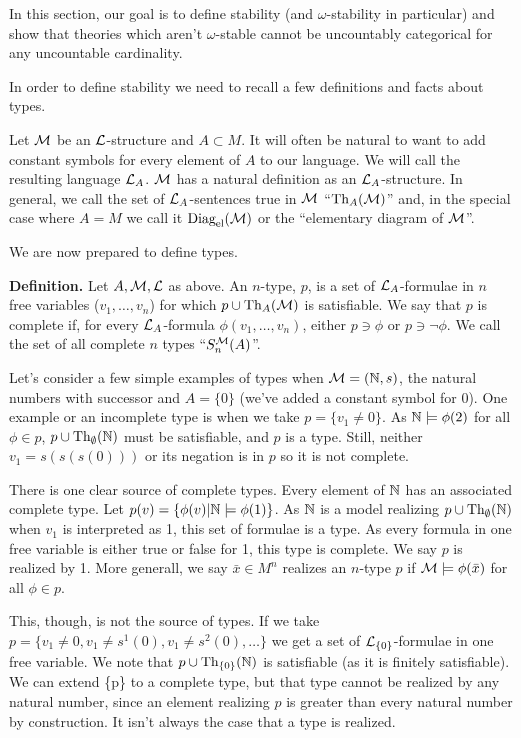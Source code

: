 In this section, our goal is to define stability (and \(\omega\)-stability in particular) and show that theories which aren't \(\omega\)-stable cannot be uncountably categorical for any uncountable cardinality. 

In order to define stability we need to recall a few definitions and facts about types. 

Let \(\mathcal{M}\) be an \(\mathcal{L}\)-structure and \(A \subset M\). It will often be natural to want to add constant symbols for every element of \(A\) to our language. 
We will call the resulting language \(\mathcal{L}_A\). \(\mathcal{M}\) has a natural definition as an \(\mathcal{L}_A\)-structure. In general, we call the set of \(\mathcal{L}_A\)-sentences true in \(\mathcal{M}\) ``\(\text{Th}_A(\mathcal{M})\)'' and, in the special case where \(A = M\) we call it \(\text{Diag}_\text{el}(\mathcal{M})\) or the ``elementary diagram of \(\mathcal{M}\)''. 

We are now prepared to define types. 

\textbf{Definition.} Let \(A, \mathcal{M}, \mathcal{L}\) as above. An \(n\)-type, \(p\), is a set of \(\mathcal{L}_A\)-formulae in \(n\) free variables (\(v_1, \ldots, v_n\)) for which \(p \cup \text{Th}_A(\mathcal{M})\) is satisfiable.
We say that \(p\) is complete if, for every \(\mathcal{L}_A\)-formula \(\phi(v_1, \ldots, v_n)\), either \(p \ni \phi\) or \(p \ni \neg \phi\). We call the set of all complete \(n\) types ``\(S_n^{\mathcal{M}}(A)\)''. 

Let's consider a few simple examples of types when  \(\mathcal{M} = (\mathbb{N},s)\), the natural numbers with successor and \(A = \{0\}\) (we've added a constant symbol for 0). One example or an incomplete type is when we take \(p = \{v_1 \neq 0\}\). As \(\mathbb{N} \models \phi(2)\) for all \(\phi \in p\), \(p \cup \text{Th}_\emptyset(\mathbb{N})\) must be satisfiable, and \(p\) is a type. Still, neither \(v_1 = s(s(s(0)))\) or its negation is in \(p\) so it is not complete. 

There is one clear source of complete types. Every element of \(\mathbb{N}\) has an associated complete type. Let \(p(v) = \{\phi(v) | \mathbb{N} \models \phi(1)\}\). As \(\mathbb{N}\) is a model realizing \(p \cup \text{Th}_\emptyset(\mathbb{N})\) when \(v_1\) is interpreted as 1, this set of formulae is a type. As every formula in one free variable is either true or false for 1, this type is complete. We say \(p\) is realized by 1. More generall, we say \(\bar{x} \in M^n\) realizes an \(n\)-type \(p\) if \(\mathcal{M} \models \phi(\bar{x})\) for all \(\phi \in p\).  

This, though, is not the source of types. If we take \(p = \{v_1 \neq 0, v_1 \neq s^1(0), v_1 \neq s^2(0), \ldots\}\) we get a set of \(\mathcal{L}_{\{0\}}\)-formulae in one free variable. We note that \(p \cup \text{Th}_{\{0\}}(\mathbb{N})\) is satisfiable (as it is finitely satisfiable). We can extend \{p\} to a complete type, but that type cannot be realized by any natural number, since an element realizing \(p\) is greater than every natural number by construction. It isn't always the case that a type is realized. 

